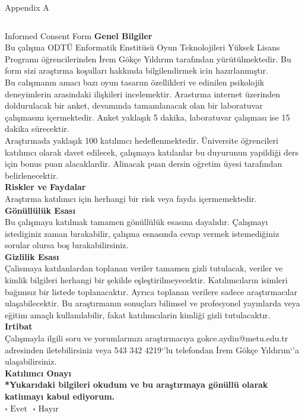 \documentclass{beamer}
\begin{document}
\begin{frame}[label=appA, plain]{Appendix A}
  \begin{columns}[t]
    \begin{exampleblock}{Informed Consent Form}
      \tiny \textbf{Genel Bilgiler}
\\ \tiny Bu çalışma ODTÜ Enformatik Enstitüsü Oyun Teknolojileri Yüksek Lisans Programı öğrencilerinden İrem Gökçe Yıldırım tarafından yürütülmektedir. Bu form sizi araştırma koşulları hakkında bilgilendirmek icin hazırlanmıştır.
\\Bu calışmanın amacı bazı oyun tasarım özellikleri ve edinilen psikolojik deneyimlerin arasindaki ilişkileri incelemektir. Arastırma internet üzerinden doldurulacak bir anket, devamında tamamlanacak olan bir laboratuvar çalışmasını içermektedir. Anket yaklaşık 5 dakika, laboratuvar çalışması ise 15 dakika sürecektir.
\\Araştırmada yaklaşık 100 katılımcı hedeflenmektedir. Üniversite öğrencileri katılımcı olarak davet edilecek, çalışmaya katılanlar bu duyurunun yapildiği ders için bonus puan alacaklardir. Alinacak puan dersin oğretim üyesi tarafından belirlenecektir. 
\\ \tiny \textbf{Riskler ve Faydalar}
\\ \tiny Araştırma katılımcı için herhangi bir risk veya fayda içermemektedir.
\\ \tiny \textbf{Gönüllülük Esası}
\\ \tiny Bu çalışmaya katılmak tamamen gönüllülük esasına dayalıdır. Çalışmayı istediginiz zaman bırakabilir, çalışma esnasında cevap vermek istemediğiniz sorular olursa boş bırakabilirsiniz.
\\ \tiny \textbf{Gizlilik Esası}
\\ \tiny Çalismaya katılanlardan toplanan veriler tamamen gizli tutulacak, veriler ve kimlik bilgileri herhangi bir şekilde eşleştirilmeyecektir. Katılımcıların isimleri bağımsız bir listede toplanacaktır. Ayrıca toplanan verilere sadece araştırmacılar ulaşabilecektir. Bu araştırmanın sonuçları bilimsel ve profesyonel yayınlarda veya eğitim amaçlı kullanılabilir, fakat katılımcılarin kimliği gizli tutulacaktır.
\\ \tiny \textbf{Irtibat}
\\ \tiny Çalışmayla ilgili soru ve yorumlarınızı araştırmacıya gokce.aydin@metu.edu.tr adresinden iletebilirsiniz veya 543 342 4219`'lu telefondan İrem Gökçe Yıldırım`'a ulaşabilirsiniz.
\\ \tiny \textbf{Katılımcı Onayı}
\\ \tiny \textbf{*Yukarıdaki bilgileri okudum ve bu araştırmaya gönüllü olarak katiımayı kabul ediyorum.}
\\ \begin{math}
	\square \mbox{ Evet} ~~~
	\square \mbox{ Hayır}
	\end{math}
    \end{exampleblock}
  \end{columns}  
\end{frame}
\end{document}
